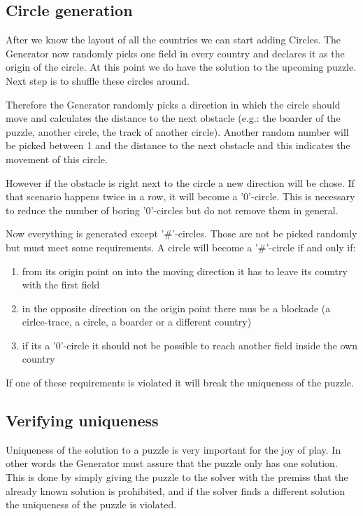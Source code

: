 \subsection{Circle generation}
After we know the layout of all the countries we can start adding Circles. The Generator now randomly picks one field in every country and declares it as the origin of the circle. At this point we do have the solution to the upcoming puzzle. Next step is to shuffle these circles around.

Therefore the Generator randomly picks a direction in which the circle should move and calculates the distance to the next obstacle (e.g.: the boarder of the puzzle, another circle, the track of another circle). Another random number will be picked between 1 and the distance to the next obstacle and this indicates the movement of this circle. 

However if the obstacle is right next to the circle a new direction will be chose. If that scenario happens twice in a row, it will become a '0'-circle. This is necessary to reduce the number of boring '0'-circles but do not remove them in general.

Now everything is generated except '\#'-circles. Those are not be picked randomly but must meet some requirements. A circle will become a '\#'-circle if and only if:
\begin{enumerate}
  \item from its origin point on into the moving direction it has to leave its country with the first field
  \item in the opposite direction on the origin point there mus be a blockade (a cirlce-trace, a circle, a boarder or a different country)
  \item if its a '0'-circle it should not be possible to reach another field inside the own country
\end{enumerate}
If one of these requirements is violated it will break the uniqueness of the puzzle.

\subsection{Verifying uniqueness}
Uniqueness of the solution to a puzzle is very important for the joy of play. In other words the Generator must assure that the puzzle only has one solution. This is done by simply giving the puzzle to the solver with the premiss that the already known solution is prohibited, and if the solver finds a different solution the uniqueness of the puzzle is violated.

